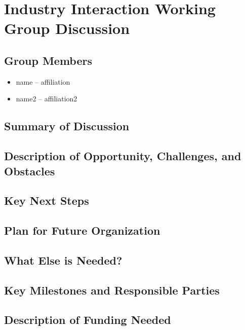 \section{Industry Interaction Working Group Discussion}
\label{sec:appendix_industry_interaction}

\subsection{Group Members}

\begin{itemize}
\item name -- affiliation
\item name2 -- affiliation2
\end{itemize}

\subsection{Summary of Discussion}

\subsection{Description of Opportunity, Challenges, and Obstacles}


\subsection{Key Next Steps}


\subsection{Plan for Future Organization}


\subsection{What Else is Needed?}


\subsection{Key Milestones and Responsible Parties}


\subsection{Description of Funding Needed}
